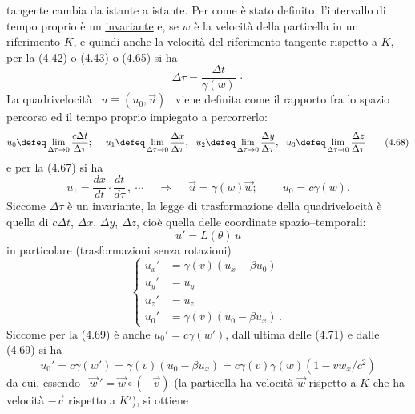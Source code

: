 tangente cambia da istante a istante. Per come \`e stato definito, l'intervallo
di tempo proprio \`e un \underline{invariante} e, se $w$ \`e la velocit\`a della
particella in un riferimento $K$, e quindi anche la velocit\`a del riferimento
tangente rispetto a $K$, per la (4.42) o (4.43) o (4.65) si ha
\begin{equation}
  \Delta\tau=\frac{\Delta t}{\gamma(w)}\,\cdot
  \tag{4.67}
\end{equation}
La quadrivelocit\`a \ $u\equiv(u_0,\vec u)$ \ viene definita come il rapporto
fra lo spazio percorso ed il tempo proprio impiegato a percorrerlo:
\begin{equation}
  u_0\defeq\lim_{\Delta\tau\to0}\frac{c\Delta t}{\Delta\tau};
  \quad\ u_1\defeq\lim_{\Delta\tau\to0}\frac{\Delta x}{\Delta\tau},
  \ \ u_2\defeq\lim_{\Delta\tau\to0}\frac{\Delta y}{\Delta\tau},
  \ \ u_3\defeq\lim_{\Delta\tau\to0}\frac{\Delta z}{\Delta\tau}
  \tag{4.68}
\end{equation}
e per la (4.67) si ha
\begin{equation}
  u_1=\frac{dx}{dt}\cdot\frac{dt}{d\tau}\,,\ \cdots
  \quad\ \Rightarrow\quad\ \vec u=\gamma(w)\vec w;\qquad\ u_0=c\gamma(w).
  \tag{4.69}
\end{equation}
Siccome $\Delta\tau$ \`e un invariante, la legge di trasformazione della
quadrivelocit\`a \`e quella di $c\Delta t$, $\Delta x$, $\Delta y$, $\Delta z$,
cio\`e quella delle coordinate spazio--temporali:
\begin{equation}
  u'=L(\theta)\,u
  \tag{4.70}
\end{equation}
in particolare (trasformazioni senza rotazioni)
\begin{equation}
  \left\{\begin{aligned}
    u_x'&=\gamma(v)(u_x-\beta u_0)\\
    u_y'&=u_y\\
    u_z'&=u_z\\
    u_0'&=\gamma(v)(u_0-\beta u_x)\,.
  \end{aligned}\right.
  \tag{4.71}
\end{equation}
Siccome per la (4.69) \`e anche $u_0'=c\gamma(w')$, dall'ultima delle (4.71) e
dalle (4.69) si ha
\begin{equation}
  u_0'=c\gamma(w')=\gamma(v)(u_0-\beta u_x)=c\gamma(v)\gamma(w)(1-vw_x/c^2)
  \tag{4.72}
\end{equation}
da cui, essendo \ $\vec w\,'=\vec w\circ(-\vec v)$ (la particella ha velocit\`a
$\vec w$ rispetto a $K$ che ha velocit\`a $-\vec v$ rispetto a $K'$), si ottiene
